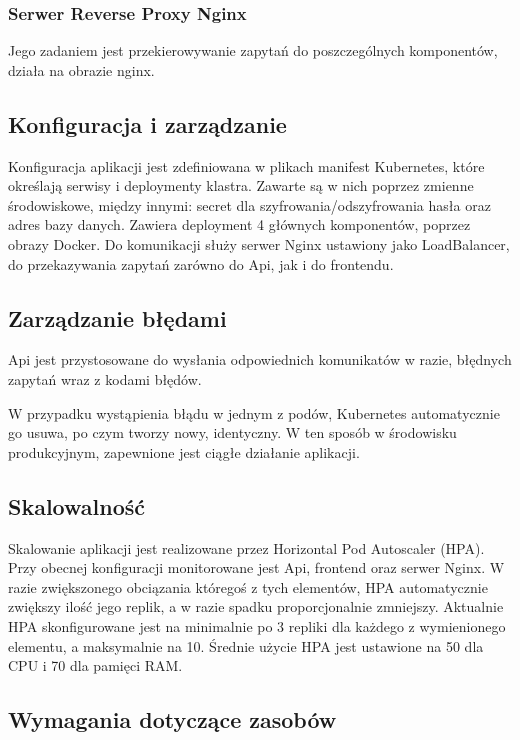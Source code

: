 \documentclass[12pt,a4paper]{article}
\begin{document}
\subsubsection{Serwer Reverse Proxy Nginx}
Jego zadaniem jest przekierowywanie zapytań do poszczególnych komponentów, działa na obrazie nginx.

\newpage

\subsection{Konfiguracja i zarządzanie}
\label{sec:NonFunctionalConditions}

Konfiguracja aplikacji jest zdefiniowana w plikach manifest Kubernetes, które określają serwisy i deploymenty klastra. Zawarte są w nich poprzez zmienne środowiskowe, między innymi: secret dla szyfrowania/odszyfrowania hasła oraz adres bazy danych. Zawiera deployment 4 głównych komponentów, poprzez obrazy Docker. Do komunikacji służy serwer Nginx ustawiony jako LoadBalancer, do przekazywania zapytań zarówno do Api, jak i do frontendu.

\subsection{Zarządzanie błędami}
\label{sec:ERD} 

Api jest przystosowane do wysłania odpowiednich komunikatów w razie, błędnych zapytań wraz z kodami błędów.

W przypadku wystąpienia błądu w jednym z podów, Kubernetes automatycznie go usuwa, po czym tworzy nowy, identyczny. W ten sposób w środowisku produkcyjnym, zapewnione jest ciągłe działanie aplikacji.

\subsection{Skalowalność}
\label{sec:ExamplesSection}
Skalowanie aplikacji jest realizowane przez Horizontal Pod Autoscaler (HPA). Przy obecnej konfiguracji monitorowane jest Api, frontend oraz serwer Nginx. W razie zwiększonego obciązania któregoś z tych elementów, HPA automatycznie zwiększy ilość jego replik, a w razie spadku proporcjonalnie zmniejszy. Aktualnie HPA skonfigurowane jest na minimalnie po 3 repliki dla każdego z wymienionego elementu, a maksymalnie na 10. Średnie użycie HPA jest ustawione na 50 dla CPU i 70 dla pamięci RAM.

\newpage

\subsection{Wymagania dotyczące zasobów}
\label{sec:ExampleTables}
\end{document}
